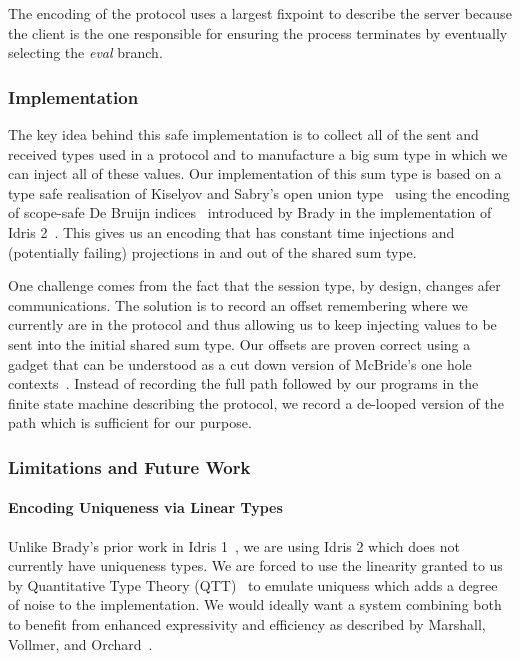 \documentclass{easychair}
\begin{document}
The encoding of the protocol uses a largest fixpoint to
describe the server because the client is the one responsible
for ensuring the process terminates by eventually selecting
the \emph{eval} branch.

\subsubsection*{Implementation}

The key idea behind this safe implementation is to collect all of the sent
and received types used in a protocol and to manufacture a big sum type
in which we can inject all of these values.
%
Our implementation of this sum type is based on a type safe realisation of
Kiselyov and Sabry's open union type~\cite{DBLP:conf/haskell/KiselyovSS13}
using the encoding of scope-safe
De Bruijn indices~\cite{MANUAL:journals/math/debruijn72}
introduced by Brady in the implementation of
Idris 2~\cite{DBLP:conf/ecoop/Brady21}.
%
This gives us an encoding that has constant time injections and
(potentially failing) projections in and out of the shared sum type.


One challenge comes from the fact that the session type, by design,
changes afer communications.
%
The solution is to record an offset remembering where we currently
are in the protocol and thus allowing us to keep injecting values to
be sent into the initial shared sum type.
%
Our offsets are proven correct using a gadget that can be understood
as a cut down version of McBride's one hole
contexts~\cite{DBLP:conf/popl/McBride08}. Instead
of recording the full path followed by our programs in the finite
state machine describing the protocol, we record a de-looped version
of the path which is sufficient for our purpose.


\subsubsection*{Limitations and Future Work}

\paragraph{Encoding Uniqueness via Linear Types}
Unlike Brady's prior work in Idris 1~\cite{DBLP:journals/aghcs/Brady17},
we are using Idris 2 which does not currently have uniqueness types.
We are forced to use the linearity granted to us by
Quantitative Type Theory (QTT)~\cite{DBLP:conf/birthday/McBride16,DBLP:conf/lics/Atkey18}
to emulate uniquess which adds a degree of noise to the implementation.
We would ideally want a system combining both to benefit from enhanced
expressivity and efficiency as described by Marshall, Vollmer,
and Orchard~\cite{DBLP:conf/esop/MarshallVO22}.
\end{document}
